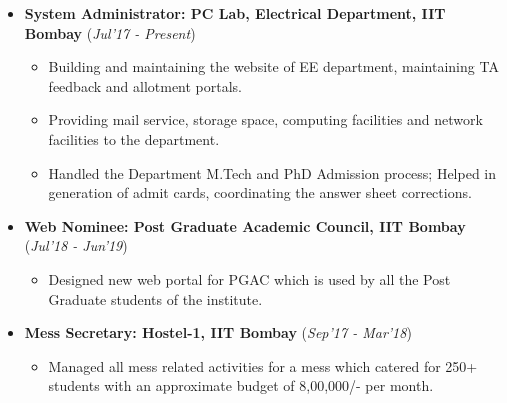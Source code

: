 \documentclass[10pt]{article}
\begin{document}
\begin{itemize}[leftmargin=0.4cm]

\item \textbf {System Administrator: PC Lab, Electrical Department, IIT Bombay} 
\hfill{(\textit{Jul'17 - Present})}
    \begin{itemize}
	\item Building and maintaining the website of EE department, maintaining TA feedback and allotment portals.
	\item Providing mail service, storage space, computing facilities and network facilities to the department.
	\item Handled the Department M.Tech and PhD Admission process; Helped in generation of admit cards, coordinating the answer sheet corrections.
	\end{itemize}
	
	
	
\item \textbf{Web Nominee: Post Graduate Academic Council, IIT Bombay}
\hfill{(\textit{Jul'18 - Jun'19})}
    \begin{itemize}
			\item Designed new web portal for PGAC which is used by all the Post Graduate students of the institute. 	
	\end{itemize}
	

\item \textbf{Mess Secretary: Hostel-1, IIT Bombay}
\hfill{(\textit{Sep'17 - Mar'18})}
    \begin{itemize}
            \item Managed all mess related activities for a mess which catered for 250+ students with an approximate budget of 8,00,000/- per month.
		\end{itemize}
			


    	
\end{itemize}


\colorbox{bl}{}
\end{document}
